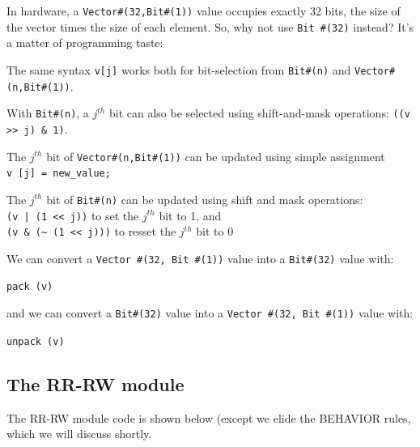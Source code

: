 In hardware, a \verb|Vector#(32,Bit#(1))| value occupies exactly 32
bits, {\ie} the size of the vector times the size of each element.
So, why not use \verb|Bit #(32)| instead?  It's a matter of
programming taste:

\begin{tightlist}

  \item The same syntax \verb|v[j]| works both for bit-selection from
        \verb|Bit#(n)| and \verb|Vector#(n,Bit#(1))|.

  \item With \verb|Bit#(n)|, a $j^{th}$ bit can also be selected using
        shift-and-mask operations: \verb|((v >> j) & 1)|.

  \item The $j^{th}$ bit of \verb|Vector#(n,Bit#(1))| can be updated
        using simple assignment \\
	\hmm \verb|v [j] = new_value;|

  \item The $j^{th}$ bit of \verb|Bit#(n)| can be updated using shift
        and mask operations: \\
	\hmm \verb'(v | (1 << j))' to set the $j^{th}$ bit to 1, and \\
	\hmm \verb|(v & (~ (1 << j)))| to resset the $j^{th}$ bit to 0

\end{tightlist}

We can convert a \verb|Vector #(32, Bit #(1))| value into a \verb|Bit#(32)| value with:

\hmm \verb|pack (v)|

and we can convert a \verb|Bit#(32)| value into a \verb|Vector #(32, Bit #(1))| value with:

\hmm \verb|unpack (v)|


\subsection{The RR-RW module}

\label{Sec_RR_RW_module}

The RR-RW module code is shown below (except we elide the BEHAVIOR
rules, which we will discuss shortly.


